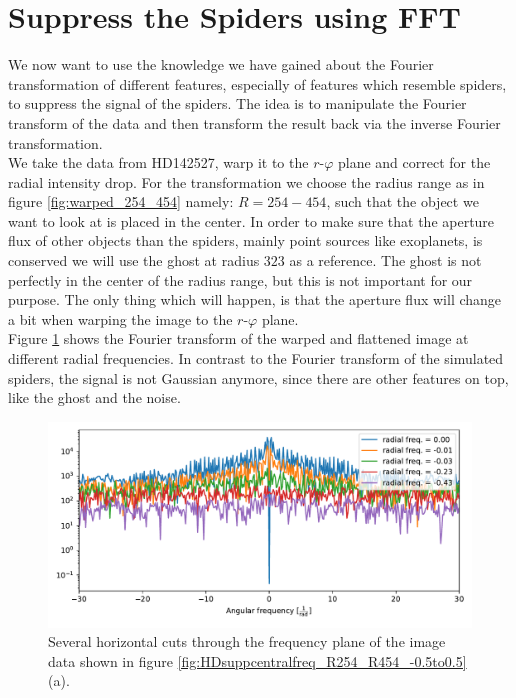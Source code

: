\section{Suppress the Spiders using FFT}
\label{sec:suppression_divide}
We now want to use the knowledge we have gained about the Fourier transformation of different features, especially of features which resemble spiders, to suppress the signal of the spiders. The idea is to manipulate the Fourier transform of the data and then transform the result back via the inverse Fourier transformation.\\
We take the data from HD142527, warp it to the $r$-$\varphi$ plane and correct for the radial intensity drop. For the transformation we choose the radius range as in figure \ref{fig:warped_254_454} namely: $R=254-454$, such that the object we want to look at is placed in the center. In order to make sure that the aperture flux of other objects than the spiders, mainly point sources like exoplanets, is conserved we will use the ghost at radius $323$ as a reference. The ghost is not perfectly in the center of the radius range, but this is not important for our purpose. The only thing which will happen, is that the aperture flux will change a bit when warping the image to the $r$-$\varphi$ plane.\\
Figure \ref{fig:rad0} shows the Fourier transform of the warped and flattened image at different radial frequencies. In contrast to the Fourier transform of the simulated spiders, the signal is not Gaussian anymore, since there are other features on top, like the ghost and the noise.
\begin{figure}[H]
	\centering
		\includegraphics[width=1.0\textwidth]{pics/rad0.pdf}
		\caption{Several horizontal cuts through the frequency plane of the image data shown in figure \ref{fig:HDsuppcentralfreq_R254_R454_-0.5to0.5}(a).}
		\label{fig:rad0}
\end{figure} 

